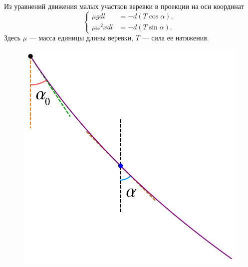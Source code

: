 \documentclass[12pt,a4paper]{article}
\begin{document}
Из уравнений движения малых участков веревки в проекции на оси координат
$$
  \left\{
  \begin{aligned}
  \mu gdl&=-d(T\cos\alpha),\\
  \mu\omega^2 xdl&=-d(T\sin\alpha).
  \end{aligned}
  \right.
$$
Здесь $\mu$ --- масса единицы длины веревки, $T$ --- сила ее натяжения.

\begin{figure}[!h]
\begin{center}
\includegraphics[scale=0.7]{ropeangle.pdf}
\end{center}
\end{figure}
\end{document}
